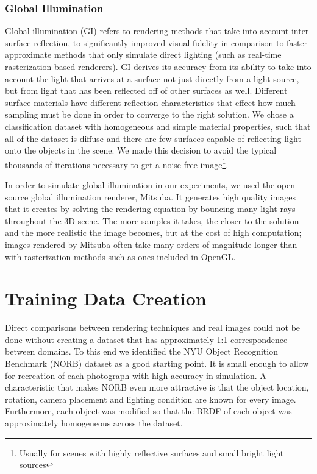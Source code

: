 \documentclass[10pt,twocolumn,letterpaper]{article}
\begin{document}
\subsubsection{Global Illumination}\label{mitsuba_section}

Global illumination (GI) refers to rendering methods that take into account inter-surface reflection, to significantly improved visual fidelity in comparison to faster approximate methods that only simulate direct lighting (such as real-time rasterization-based renderers).  GI derives its accuracy from its ability to take into account the light that arrives at a surface not just directly from a light source, but from light that has been reflected off of other surfaces as well. Different surface materials have different reflection characteristics that effect how much sampling must be done in order to converge to the right solution. We chose a classification dataset with homogeneous and simple material properties, such that all of the dataset is diffuse and there are few surfaces capable of reflecting light onto the objects in the scene. We made this decision to avoid the typical thousands of iterations necessary to get a noise free image\footnote{Usually for scenes with highly reflective surfaces and small bright light sources}.

In order to simulate global illumination in our experiments, we used the open source global illumination renderer, Mitsuba.  It generates high quality images that it creates by solving the rendering equation by bouncing many light rays throughout the 3D scene.  The more samples it takes, the closer to the solution and the more realistic the image becomes, but at the cost of high computation; images rendered by Mitsuba often take many orders of magnitude longer than with rasterization methods such as ones included in OpenGL.  

\section{Training Data Creation}
Direct comparisons between rendering techniques and real images could not be done without creating a dataset that has approximately 1:1 correspondence between domains.  To this end we identified the NYU Object Recognition Benchmark (NORB) dataset \cite{LeCun:2004:LMG:1896300.1896315} as a good starting point. It is small enough to allow for recreation of each photograph with high accuracy in simulation.  A characteristic that makes NORB even more attractive is that the object location, rotation, camera placement and lighting condition are known for every image. Furthermore, each object was modified so that the BRDF of each object was approximately homogeneous across the dataset.
\end{document}
